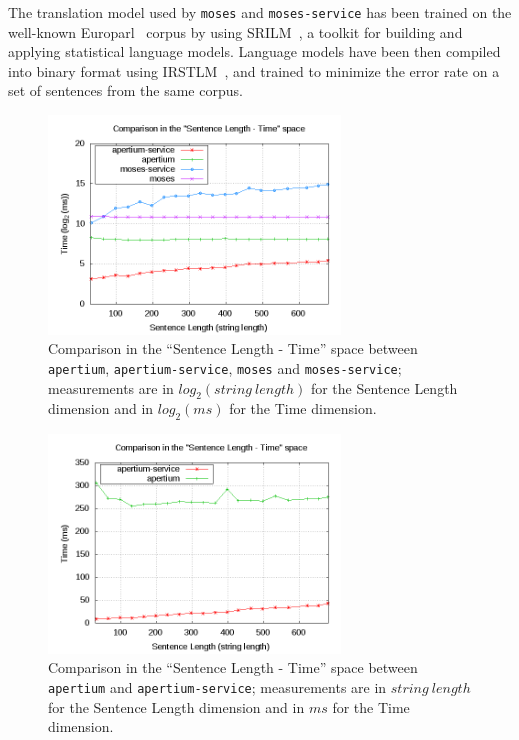 \documentclass[11pt]{article}
\begin{document}
The translation model used by {\tt moses} and {\tt moses-service} has been trained on the well-known Europarl~\citep{europarl} corpus by using SRILM~\citep{srilm}, a toolkit for building and applying statistical language models. Language models have been then compiled into binary format using IRSTLM~\citep{irstlm}, and trained to minimize the error rate on a set of sentences from the same corpus. 

\begin{figure}[!ht]
\begin{center}
\includegraphics[width=7.75cm]{comp}
\end{center}
\caption{Comparison in the ``Sentence Length - Time'' space between {\tt apertium}, {\tt apertium-service}, {\tt moses} and {\tt moses-service}; measurements are in $log_{2}(string\ length)$ for the Sentence Length dimension and in $log_{2}(ms)$ for the Time dimension.}
\label{fig:comp}
\end{figure}

\begin{figure}[!ht]
\begin{center}
\includegraphics[width=7.75cm]{compap}
\end{center}
\caption{Comparison in the ``Sentence Length - Time'' space between {\tt apertium} and {\tt apertium-service}; measurements are in $string\ length$ for the Sentence Length dimension and in $ms$ for the Time dimension.}
\label{fig:compap}
\end{figure}
\end{document}
